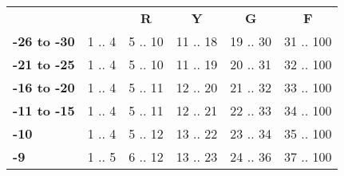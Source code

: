\documentclass[oneside]{book}
\begin{document}
\newpage

\begin{table}[h]
\begin{tabular}{lccccc}
\multicolumn{1}{c}{}                       & \cellcolor[HTML]{333333}{\color[HTML]{FFFFFF} \textbf{B}} & \cellcolor[HTML]{FE0000}\textbf{R} & \multicolumn{1}{c}{\cellcolor[HTML]{F8FF00}\textbf{Y}} & \multicolumn{1}{c}{\cellcolor[HTML]{34FF34}\textbf{G}} & \multicolumn{1}{c}{\cellcolor[HTML]{C0C0C0}\textbf{F}} \\
\rowcolor[HTML]{FFFFFF} 
{\color[HTML]{000000} \textbf{-26 to -30}} & {\color[HTML]{333333} 1 .. 4}                             & 5 .. 10                            & 11 .. 18                                               & 19 .. 30                                               & 31 .. 100                                              \\
\rowcolor[HTML]{EFEFEF} 
\textbf{-21 to -25}                        & {\color[HTML]{333333} 1 .. 4}                             & 5 .. 10                            & 11 .. 19                                               & 20 .. 31                                               & 32 .. 100                                              \\
\rowcolor[HTML]{FFFFFF} 
\textbf{-16 to -20}                        & {\color[HTML]{333333} 1 .. 4}                             & 5 .. 11                            & 12 .. 20                                               & 21 .. 32                                               & 33 .. 100                                              \\
\rowcolor[HTML]{EFEFEF} 
\textbf{-11 to -15}                        & {\color[HTML]{333333} 1 .. 4}                             & 5 .. 11                            & 12 .. 21                                               & 22 .. 33                                               & 34 .. 100                                              \\
\rowcolor[HTML]{FFFFFF} 
\textbf{-10}                               & {\color[HTML]{333333} 1 .. 4}                             & 5 .. 12                            & 13 .. 22                                               & 23 .. 34                                               & 35 .. 100                                              \\
\rowcolor[HTML]{EFEFEF} 
\textbf{-9}                                & {\color[HTML]{333333} 1 .. 5}                             & 6 .. 12                            & 13 .. 23                                               & 24 .. 36                                               & 37 .. 100                                              \\

\end{tabular}
\end{table}
\end{document}
